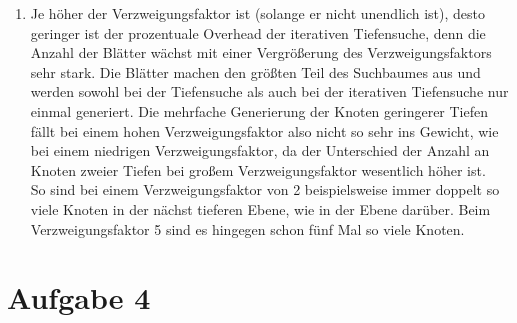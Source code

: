 \documentclass[a4paper,10pt]{article}
\begin{document}
\begin{enumerate}[~~a)]
	\item
	Je höher der Verzweigungsfaktor ist (solange er nicht unendlich ist), desto geringer ist der prozentuale Overhead der iterativen Tiefensuche, denn die Anzahl der Blätter wächst mit einer Vergrößerung des Verzweigungsfaktors sehr stark. Die Blätter machen den größten Teil des Suchbaumes aus und werden sowohl bei der Tiefensuche als auch bei der iterativen Tiefensuche nur einmal generiert. Die mehrfache Generierung der Knoten geringerer Tiefen fällt bei einem hohen Verzweigungsfaktor also nicht so sehr ins Gewicht, wie bei einem niedrigen Verzweigungsfaktor, da der Unterschied der Anzahl an Knoten zweier Tiefen bei großem Verzweigungsfaktor wesentlich höher ist.\\
	So sind bei einem Verzweigungsfaktor von 2 beispielsweise immer doppelt so viele Knoten in der nächst tieferen Ebene, wie in der Ebene darüber. Beim Verzweigungsfaktor 5 sind es hingegen schon fünf Mal so viele Knoten.
\end{enumerate}

\section*{Aufgabe 4}
\end{document}
